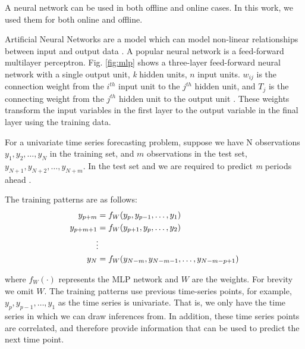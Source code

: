 A neural network can be used in both offline and online cases. In this work, we used them for both online and offline.

Artificial Neural Networks are a model which can model non-linear relationships between input and output data \cite{Akaike1974}. A popular neural network is a feed-forward multilayer perceptron. Fig. \ref{fig:mlp} shows a three-layer feed-forward neural network with a single output unit, \textit{k} hidden units, $n$ input units. $w_{ij}$ is the connection weight from the $i^{th}$ input unit to the $j^{th}$ hidden unit,  and $T_j$ is the connecting weight from the $j^{th}$ hidden unit to the output unit \cite{Pao2007}. These weights transform the input variables in the first layer to the output variable in the final layer using the training data. 


For a univariate time series forecasting problem, suppose we have N observations $y_1, y_2, \ldots, y_N$ in the training set, and $m$ observations in the test set, $y_{N+1}, y_{N+2}, \ldots, y_{N+m}$. In the test set and we are required to predict \textit{m} periods ahead \cite{Pao2007}. 

The training patterns are as follows:
\begin{align}
y_{p+m} & =f_{W}(y_p, y_{p-1},\ldots,y_1)\\
y_{p+m+1} & =f_{W}(y_{p+1}, y_{p},\ldots,y_2)\\
&\vdotswithin  \notag \\
y_{N} & =f_{W}(y_{N-m},y_{N-m-1},\ldots,y_{N-m-p+1})
\end{align}

\noindent where $f_{W}(\cdot)$ represents the MLP network and $W$ are the weights. For brevity we omit $W$. The training patterns use previous time-series points, for example, $y_p, y_{p-1},\ldots,y_1$ as the time series is univariate. That is, we only have the time series in which we can draw inferences from. In addition, these time series points are correlated, and therefore provide information that can be used to predict the next time point.

